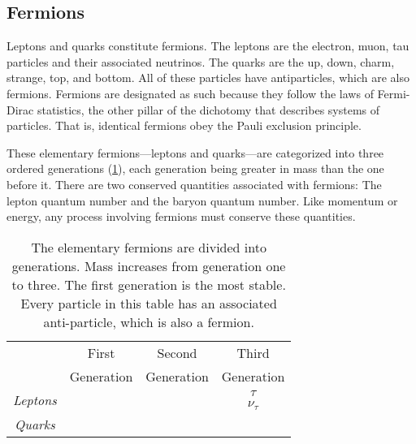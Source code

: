 	\subsection{Fermions}
	\label{sec:fermions}

	Leptons and quarks constitute fermions. The leptons are the electron, muon, tau particles and their associated neutrinos. The quarks are the up, down, charm, strange, top, and bottom. All of these particles have antiparticles, which are also fermions. Fermions are designated as such because they follow the laws of Fermi-Dirac statistics, the other pillar of the dichotomy that describes systems of particles. That is, identical fermions obey the Pauli exclusion principle. 

	These elementary fermions---leptons and quarks---are categorized into three ordered generations (\TAB \ref{table:leptons}), each generation being greater in mass than the one before it. There are two conserved quantities associated with fermions: The lepton quantum number and the baryon quantum number. Like momentum or energy, any process involving fermions must conserve these quantities. 

	\begin{table}[H]
		\centering
		\captionsetup{width=4in}
		\caption[The Elementary Fermions]{The elementary fermions are divided into generations. Mass increases from generation one to three. The first generation is the most stable. Every particle in this table has an associated anti-particle, which is also a fermion.}
		\label{table:leptons}
		\begin{tabular}{cccc}
			\toprule
			 & First & Second & Third \\
			 & Generation & Generation & Generation \\
			\midrule
			\multirow{2}{*}{\emph{Leptons}} & \HepParticle{\Pelectron} & \HepParticle{\Pmu} & $\tau$ \\ 
			 & \HepParticle{\Pnue} & \HepParticle{\Pnum} & $\nu_{\tau}$ \\
			\midrule
			\multirow{2}{*}{\emph{Quarks}} & \HepParticle{\Pup}{}{} & \HepParticle{\Pcharm}{}{} & \HepParticle{\Ptop}{}{} \\
			 & \HepParticle{\Pdown}{}{} & \HepParticle{\Pstrange}{}{} & \HepParticle{\Pbottom}{}{} \\
			\bottomrule
		\end{tabular}
	\end{table}

